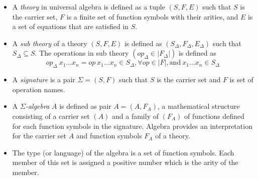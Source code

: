 \begin{itemize}
    \item A \textit{theory} in universal algebra is defined as a tuple $(S,F,E)$
    such that $S$ is the carrier set, $F$ is a finite set of function symbols
    with their arities, and $E$ is a set of equations that are satisfied in $S$.

    \item A \emph{sub theory} of a theory $(S,F,E)$ is defined as
    $(S_\Delta,F_\Delta,E_\Delta)$ such that $S_\Delta \subseteq S$. The operations
    in sub theory $(op_\Delta \in |F_\Delta|)$ is defined as
    \[op_\Delta\ x_1...x_n = op\ x_1...x_n \in S_\Delta,\forall op \in
    |F|,\text{and}\ x_1...x_n \in S_\Delta \]  

    \item A \textit{signature} is a pair $\Sigma = (S,F)$ such that $S$ is the
    carrier set and $F$ is set of operation names.

    \item A \emph{$\Sigma$-algebra} $A$ is defined as pair $A = (A,F_A)$, a
    mathematical structure consisting of a carrier set $(A)$ and a family of
    $(F_A)$ of functions defined for each function symbols in the signature.
    Algebra provides an interpretation for the carrier set $A$ and function
    symbols $F_A$ of a theory.

    \item The type (or language) of the algebra is a set of function symbols.
    Each member of this set is assigned a positive number which is the arity of
    the member.
\end{itemize}

